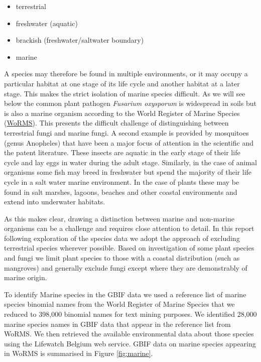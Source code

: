 \documentclass[]{book}
\providecommand{\tightlist}{%
  \setlength{\itemsep}{0pt}\setlength{\parskip}{0pt}}
\theoremstyle{definition}
\theoremstyle{definition}
\theoremstyle{definition}
\theoremstyle{remark}
\begin{document}
\begin{itemize}
\tightlist
\item
  terrestrial
\item
  freshwater (aquatic)
\item
  brackish (freshwater/saltwater boundary)
\item
  marine
\end{itemize}

A species may therefore be found in multiple environments, or it may
occupy a particular habitat at one stage of its life cycle and another
habitat at a later stage. This makes the strict isolation of marine
species difficult. As we will see below the common plant pathogen
\emph{Fusarium oxysporum} is widespread in soils but is also a marine
organism according to the World Register of Marine Species
(\href{http://www.marinespecies.org/aphia.php?p=taxdetails\&id=100523}{WoRMS}).
This presents the difficult challenge of distinguishing between
terrestrial fungi and marine fungi. A second example is provided by
mosquitoes (genus Anopheles) that have been a major focus of attention
in the scientific and the patent literature. These insects are aquatic
in the early stage of their life cycle and lay eggs in water during the
adult stage. Similarly, in the case of animal organisms some fish may
breed in freshwater but spend the majority of their life cycle in a salt
water marine environment. In the case of plants these may be found in
salt marshes, lagoons, beaches and other coastal environments and extend
into underwater habitats.

As this makes clear, drawing a distinction between marine and non-marine
organisms can be a challenge and requires close attention to detail. In
this report following exploration of the species data we adopt the
approach of excluding terrestrial species wherever possible. Based on
investigation of some plant species and fungi we limit plant species to
those with a coastal distribution (such as mangroves) and generally
exclude fungi except where they are demonstrably of marine origin.

To identify Marine species in the GBIF data we used a reference list of
marine species binomial names from the World Register of Marine Species
that we reduced to 398,000 binomial names for text mining purposes. We
identified 28,000 marine species names in GBIF data that appear in the
reference list from WoRMS. We then retrieved the available environmental
data about those species using the Lifewatch Belgium web service. GBIF
data on marine species appearing in WoRMS is summarised in Figure
\ref{fig:marine}.
\end{document}
